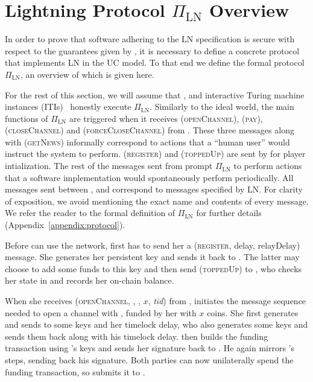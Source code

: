 \section{Lightning Protocol $\Pi_{\mathrm{LN}}$ Overview}
\label{sec:ov-protocol}

  In order to prove that software adhering to the LN specification is secure
  with respect to the guarantees given by \fpaynet, it is necessary to define a
  concrete protocol that implements LN in the UC model. To that end we define
  the formal protocol $\Pi_{\mathrm{LN}}$, an overview of which is given here.

  For the rest of this section, we will assume that \alice, \bob{} and
  \charlie{} interactive Turing machine instances (ITIs)~\cite{uc} honestly
  execute $\Pi_{\mathrm{LN}}$. Similarly to the ideal world, the main functions
  of $\Pi_{\mathrm{LN}}$ are triggered when it receives (\textsc{openChannel}),
  (\textsc{pay}), (\textsc{closeChannel}) and (\textsc{forceCloseChannel}) from
  \environment{}. These three messages along with (\textsc{getNews}) informally
  correspond to actions that a ``human user'' would instruct the system to
  perform. (\textsc{register}) and (\textsc{toppedUp}) are sent by
  \environment{} for player intialization. The rest of the messages sent from
  \environment{} prompt $\Pi_{\mathrm{LN}}$ to perform actions that a software
  implementation would spontaneously perform periodically. All messages sent
  between \alice, \bob{} and \charlie{} correspond to messages specified by LN.
  For clarity of exposition, we avoid mentioning the exact name and contents of
  every message. We refer the reader to the formal definition of
  $\Pi_{\mathrm{LN}}$ for further details (Appendix~\ref{appendix:protocol}).

    Before \alice{} can use the network, \environment{} first has to send her a
    (\textsc{register}, delay, relayDelay) message. She generates her
    persistent key and sends it back to \environment{}. The latter may choose to
    add some funds to this key and then send (\textsc{toppedUp}) to \alice, who
    checks her state in \ledger{} and records her on-chain balance.

    When she receives (\textsc{openChannel}, \alice, \bob, $x$, \textit{tid})
    from \environment, \alice{} initiates the message sequence needed to open a
    channel with \bob, funded by her with $x$ coins. She first generates and
    sends to \bob{} some keys and her timelock delay, who also generates some
    keys and sends them back along with his timelock delay. \alice{} then builds
    the funding transaction using \bob's keys and sends her signature back to
    \bob. He again mirrors \alice's steps, sending back his signature. Both
    parties can now unilaterally spend the funding transaction, so \alice{}
    submits it to \ledger.

